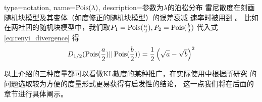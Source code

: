 {
  type=notation,
  name={$\operatorname{Pois}(\lambda)$},
  description={参数为$\lambda$的泊松分布}
}
雷尼散度在刻画随机块模型及其变体（如度修正的随机块模型）的误差衰减
速率时被用到 \cite{zhang2016, gao2018community}。
比如在两社团的随机块模型中，我们取$P_1=\operatorname{Pois}(\frac{a}{2}),P_2=\operatorname{Pois}(\frac{b}{2})$
代入式 \eqref{eq:renyi_divergence} 
得
\begin{equation}\label{eq:renyi_d12_ab}
  D_{1/2}(\operatorname{Pois}(\frac{a}{2}) || \operatorname{Pois}(\frac{b}{2}))
  = \frac{1}{2}\left(\sqrt{a} - \sqrt{b}\right)^2
\end{equation}

以上介绍的三种度量都可以看做KL散度的某种推广，在实际使用中根据所研究
的问题选取较为方便的度量形式更易获得有启发性的结论，
这一点我们将在后面的章节进行具体阐示。
